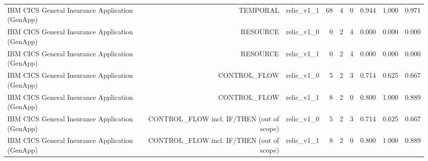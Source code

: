 \begin{tabular}{lrrrrrrrr}
IBM CICS General Insurance Application (GenApp) & TEMPORAL & relic\_v1\_1 & 68 & 4 & 0 & 0.944 & 1.000 & 0.971 \\
IBM CICS General Insurance Application (GenApp) & RESOURCE & relic\_v1\_0 & 0 & 2 & 4 & 0.000 & 0.000 & 0.000 \\
IBM CICS General Insurance Application (GenApp) & RESOURCE & relic\_v1\_1 & 0 & 2 & 4 & 0.000 & 0.000 & 0.000 \\
IBM CICS General Insurance Application (GenApp) & CONTROL\_FLOW & relic\_v1\_0 & 5 & 2 & 3 & 0.714 & 0.625 & 0.667 \\
IBM CICS General Insurance Application (GenApp) & CONTROL\_FLOW & relic\_v1\_1 & 8 & 2 & 0 & 0.800 & 1.000 & 0.889 \\
IBM CICS General Insurance Application (GenApp) & CONTROL\_FLOW incl. IF/THEN (out of scope) & relic\_v1\_0 & 5 & 2 & 3 & 0.714 & 0.625 & 0.667 \\
IBM CICS General Insurance Application (GenApp) & CONTROL\_FLOW incl. IF/THEN (out of scope) & relic\_v1\_1 & 8 & 2 & 0 & 0.800 & 1.000 & 0.889 \\
\bottomrule
\end{tabular}
